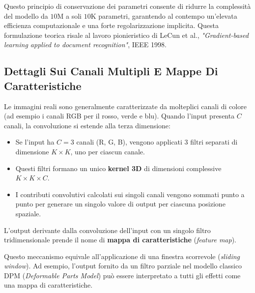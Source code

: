 ﻿\documentclass[11pt, a4paper]{article}
\begin{document}

Questo principio di conservazione dei parametri consente di ridurre la complessità del modello da $10\text{M}$ a soli $10\text{K}$ parametri, garantendo al contempo un'elevata efficienza computazionale e una forte regolarizzazione implicita. Questa formulazione teorica risale al lavoro pionieristico di LeCun et al., \emph{"Gradient-based learning applied to document recognition"}, IEEE 1998.

\newpage

\subsection{Dettagli Sui Canali Multipli E Mappe Di Caratteristiche}

Le immagini reali sono generalmente caratterizzate da molteplici canali di colore (ad esempio i canali RGB per il rosso, verde e blu). Quando l'input presenta $C$ canali, la convoluzione si estende alla terza dimensione:
\begin{itemize}
    \item Se l'input ha $C=3$ canali (R, G, B), vengono applicati $3$ filtri separati di dimensione $K \times K$, uno per ciascun canale.
    \item Questi filtri formano un unico \textbf{kernel 3D} di dimensioni complessive $K \times K \times C$.
    \item I contributi convolutivi calcolati sui singoli canali vengono sommati punto a punto per generare un singolo valore di output per ciascuna posizione spaziale.
\end{itemize}

L'output derivante dalla convoluzione dell'input con un singolo filtro tridimensionale prende il nome di \textbf{mappa di caratteristiche} (\emph{feature map}).


Questo meccanismo equivale all'applicazione di una finestra scorrevole (\emph{sliding window}). Ad esempio, l'output fornito da un filtro parziale nel modello classico DPM (\emph{Deformable Parts Model}) può essere interpretato a tutti gli effetti come una mappa di caratteristiche.
\end{document}
